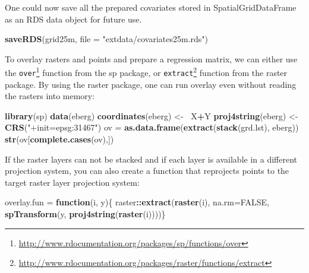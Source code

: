 \documentclass[graybox,natbib,nospthms,UStrade]{svmono}
\newenvironment{Shaded}{\begin{snugshade}}{\end{snugshade}}
\newcommand{\ControlFlowTok}[1]{\textcolor[rgb]{0.27,0.27,0.27}{\textbf{#1}}}
\newcommand{\DataTypeTok}[1]{\textcolor[rgb]{0.27,0.27,0.27}{#1}}
\newcommand{\ErrorTok}[1]{\textcolor[rgb]{0.14,0.14,0.14}{\textbf{#1}}}
\newcommand{\KeywordTok}[1]{\textcolor[rgb]{0.27,0.27,0.27}{\textbf{#1}}}
\newcommand{\NormalTok}[1]{#1}
\newcommand{\OperatorTok}[1]{\textcolor[rgb]{0.43,0.43,0.43}{\textbf{#1}}}
\newcommand{\OtherTok}[1]{\textcolor[rgb]{0.37,0.37,0.37}{#1}}
\newcommand{\StringTok}[1]{\textcolor[rgb]{0.5,0.5,0.5}{#1}}
\renewcommand{\href}[2]{#2 (\url{#1})}
\renewcommand{\href}[2]{#2\footnote{\url{#1}}}
\begin{document}
One could now save all the prepared covariates stored in SpatialGridDataFrame as an RDS data object for future use.

\begin{Shaded}
\begin{Highlighting}[]
\KeywordTok{saveRDS}\NormalTok{(grid25m, }\DataTypeTok{file =} \StringTok{"extdata/covariates25m.rds"}\NormalTok{)}
\end{Highlighting}
\end{Shaded}

To overlay rasters and points and prepare a regression matrix, we can either use the \href{http://www.rdocumentation.org/packages/sp/functions/over}{\texttt{over}} function from the sp package, or \href{http://www.rdocumentation.org/packages/raster/functions/extract}{\texttt{extract}} function from the raster package. By using the raster package, one can run overlay even without reading the rasters into memory:

\begin{Shaded}
\begin{Highlighting}[]
\KeywordTok{library}\NormalTok{(sp)}
\KeywordTok{data}\NormalTok{(eberg)}
\KeywordTok{coordinates}\NormalTok{(eberg) <-}\StringTok{ }\ErrorTok{~}\NormalTok{X}\OperatorTok{+}\NormalTok{Y}
\KeywordTok{proj4string}\NormalTok{(eberg) <-}\StringTok{ }\KeywordTok{CRS}\NormalTok{(}\StringTok{"+init=epsg:31467"}\NormalTok{)}
\NormalTok{ov =}\StringTok{ }\KeywordTok{as.data.frame}\NormalTok{(}\KeywordTok{extract}\NormalTok{(}\KeywordTok{stack}\NormalTok{(grd.lst), eberg))}
\KeywordTok{str}\NormalTok{(ov[}\KeywordTok{complete.cases}\NormalTok{(ov),])}
\end{Highlighting}
\end{Shaded}

If the raster layers can not be stacked and if each layer is available in a different projection system, you can also create a function that reprojects points to the target raster layer projection system:

\begin{Shaded}
\begin{Highlighting}[]
\NormalTok{overlay.fun =}\StringTok{ }\ControlFlowTok{function}\NormalTok{(i, y)\{}
\NormalTok{  raster}\OperatorTok{::}\KeywordTok{extract}\NormalTok{(}\KeywordTok{raster}\NormalTok{(i), }\DataTypeTok{na.rm=}\OtherTok{FALSE}\NormalTok{, }
      \KeywordTok{spTransform}\NormalTok{(y, }\KeywordTok{proj4string}\NormalTok{(}\KeywordTok{raster}\NormalTok{(i))))\}}
\end{Highlighting}
\end{Shaded}
\end{document}
